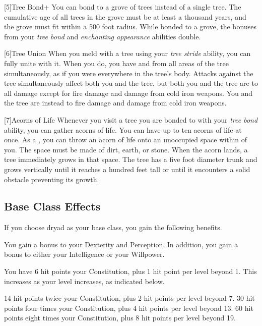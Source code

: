     [5]{Tree Bond+} You can bond to a grove of trees instead of a single tree.
      The cumulative age of all trees in the grove must be at least a thousand years, and the grove must fit within a 500 foot radius.
      While bonded to a grove, the bonuses from your \textit{tree bond} and \textit{enchanting appearance} abilities double.

    [6]{Tree Union} When you meld with a tree using your \textit{tree stride} ability, you can fully unite with it.
      When you do, you have  and  from all areas of the tree simultaneously, as if you were everywhere in the tree's body.
      Attacks against the tree simultaneously affect both you and the tree, but both you and the tree are \impervious to all damage except for fire damage and damage from cold iron weapons.
      You and the tree are instead \vulnerable to fire damage and damage from cold iron weapons.

    [7]{Acorns of Life} Whenever you visit a tree you are bonded to with your \textit{tree bond} ability, you can gather acorns of life.
      You can have up to ten acorns of life at once.
      As a , you can throw an acorn of life onto an unoccupied  space within \medrange of you.
      The space must be made of dirt, earth, or stone.
      When the acorn lands, a tree immediately grows in that space.
      The tree has a five foot diameter trunk and grows vertically until it reaches a hundred feet tall or until it encounters a solid obstacle preventing its growth.

  \subsection{Base Class Effects}
    If you choose dryad as your base class, you gain the following benefits.

      You gain a  bonus to your Dexterity and Perception. In addition, you gain a  bonus to either your Intelligence or your Willpower.

      You have 6 hit points \add  your Constitution, plus 1 hit point per level beyond 1.
      This increases as your level increases, as indicated below.
      \begin{itemize}
         14 hit points \add twice your Constitution, plus 2 hit points per level beyond 7.
         30 hit points \add four times your Constitution, plus 4 hit points per level beyond 13.
         60 hit points \add eight times your Constitution, plus 8 hit points per level beyond 19.
      \end{itemize}

